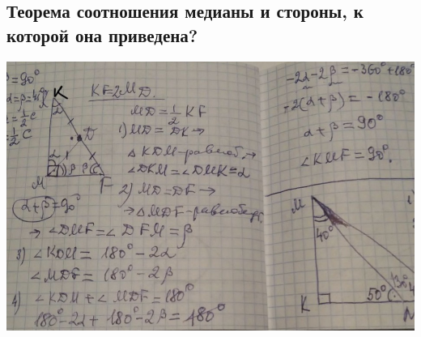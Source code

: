 \documentclass[12pt, letterpaper]{article}
\begin{document}
\subsection{Теорема соотношения медианы и стороны, к которой она приведена?}
\includegraphics[scale=0.3]{photo9.jpg} \\
\end{document}
